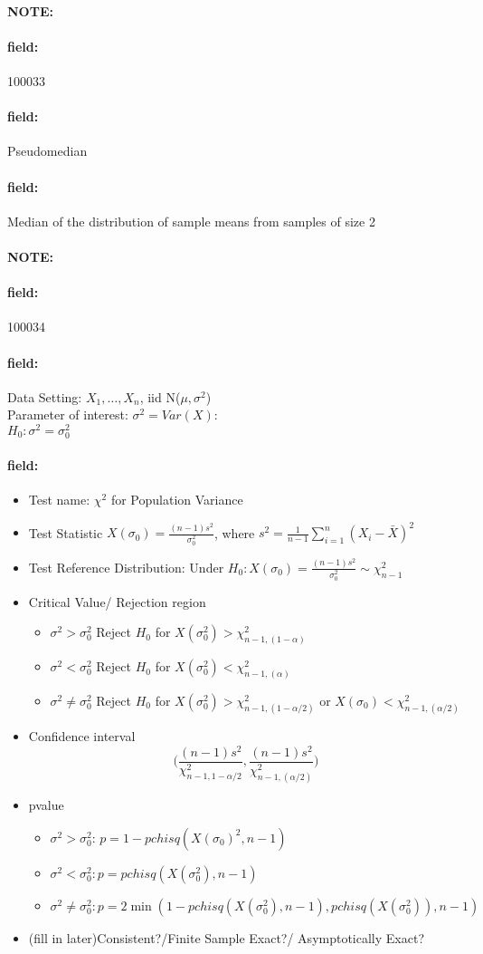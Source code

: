 \documentclass[12pt]{article}
\newenvironment{note}{\paragraph{NOTE:}}{}
\newenvironment{field}{\paragraph{field:}}{}
\begin{document}
\begin{note} \begin{field} \tiny 100033 \end{field}
 \begin{field}
  Pseudomedian
 \end{field}
 \begin{field}
  Median of the distribution of sample means from samples of size 2
 \end{field}
\end{note}


\begin{note} \begin{field} \tiny 100034 \end{field}
 \begin{field}
  Data Setting: $X_1, \ldots, X_n$, iid N($\mu,\sigma^2$)\\
  Parameter of interest: $\sigma^2 = Var(X)$:\\
   $H_0: \sigma^2 = \sigma_0^2$
 \end{field}
 \begin{field}
  \begin{itemize}
   \item Test name: $\chi^2$ for Population Variance
   \item Test Statistic $X(\sigma_0) = \frac{(n-1)s^2}{\sigma_0^2}$, where $s^2 = \frac{1}{n-1} \sum_{i=1}^n(X_i - \bar{X})^2$
   \item Test Reference Distribution: Under $H_0: X(\sigma_0) = \frac{(n-1)s^2}{\sigma_0^2} \sim \chi_{n-1}^2$
   \item Critical Value/ Rejection region
         \begin{itemize}
          \item  $\sigma^2 > \sigma_0^2$ Reject $H_0$ for $X(\sigma_0^2) > \chi^2_{n-1,(1-\alpha)}$
          \item $\sigma^2 < \sigma_0^2$ Reject $H_0$ for $X(\sigma_0^2) < \chi^2_{n-1,(\alpha)}$
          \item $\sigma^2 \neq \sigma_0^2$ Reject $H_0$ for $X(\sigma_0^2) > \chi^2_{n-1,(1 - \alpha/2)}$ or $X(\sigma_0) < \chi^2_{n-1,(\alpha/2)}$
         \end{itemize}
   \item Confidence interval  $$ \bigg( \frac{(n-1)s^2}{\chi^2_{n-1,1 - \alpha/2}}, \frac{(n-1)s^2}{\chi^2_{n-1,(\alpha/2)}}\bigg)$$
   \item pvalue
         \begin{itemize}
          \item $\sigma^2 > \sigma_0^2$: $p = 1 - pchisq(X(\sigma_0)^2,n-1)$
          \item $\sigma^2 < \sigma_0^2: p = pchisq(X(\sigma_0^2),n-1)$
          \item $\sigma^2 \neq \sigma_0^2: p = 2\min(1 - pchisq(X(\sigma_0^2), n-1), pchisq(X(\sigma_0^2)),n-1)$
         \end{itemize}
   \item (fill in later)Consistent?/Finite Sample Exact?/ Asymptotically Exact?
  \end{itemize}
 \end{field}
\end{note}
\end{document}
